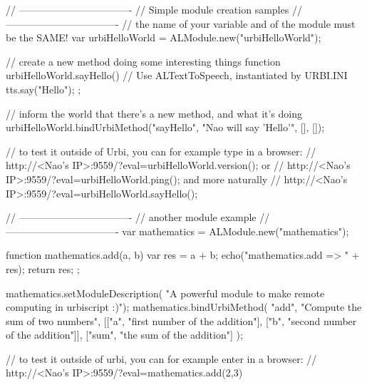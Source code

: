 \begin{urbiunchecked}
// ----------------------------------
// Simple module creation samples
// ----------------------------------
// the name of your variable and of the module must be the SAME!
var urbiHelloWorld = ALModule.new("urbiHelloWorld");

// create a new method doing some interesting things
function urbiHelloWorld.sayHello()
{
  // Use ALTextToSpeech, instantiated by URBI.INI
  tts.say("Hello");
};

// inform the world that there's a new method, and what it's doing
urbiHelloWorld.bindUrbiMethod("sayHello", "Nao will say 'Hello'", [], []);

// to test it outside of Urbi, you can for example type in a browser:
// http://<Nao's IP>:9559/?eval=urbiHelloWorld.version(); or
// http://<Nao's IP>:9559/?eval=urbiHelloWorld.ping(); and more naturally
// http://<Nao's IP>:9559/?eval=urbiHelloWorld.sayHello();

// ----------------------------------
// another module example
// ----------------------------------
var mathematics = ALModule.new("mathematics");

function mathematics.add(a, b)
{
  var res = a + b;
  echo("mathematics.add => " + res);
  return res;
};

mathematics.setModuleDescription(
  "A powerful module to make remote computing in urbiscript :)");
mathematics.bindUrbiMethod( "add", "Compute the sum of two numbers",
[["a",   "first number of the addition"],
 ["b",   "second number of the addition"]],
 ["sum", "the sum of the addition"] );

// to test it outside of urbi, you can for example enter in a browser:
// http://<Nao's IP>:9559/?eval=mathematics.add(2,3)
\end{urbiunchecked}


